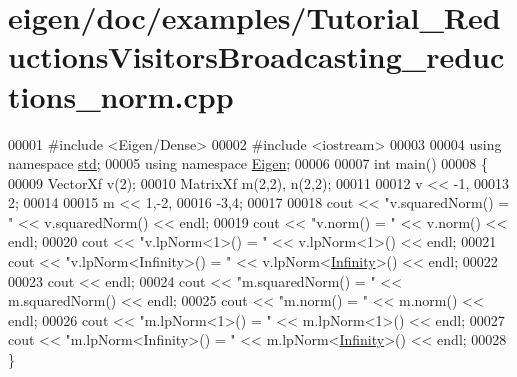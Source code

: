 \hypertarget{eigen_2doc_2examples_2_tutorial___reductions_visitors_broadcasting__reductions__norm_8cpp_source}{}\section{eigen/doc/examples/\+Tutorial\+\_\+\+Reductions\+Visitors\+Broadcasting\+\_\+reductions\+\_\+norm.cpp}
\label{eigen_2doc_2examples_2_tutorial___reductions_visitors_broadcasting__reductions__norm_8cpp_source}

\begin{DoxyCode}
00001 \textcolor{preprocessor}{#include <Eigen/Dense>}
00002 \textcolor{preprocessor}{#include <iostream>}
00003 
00004 \textcolor{keyword}{using namespace }\hyperlink{namespacestd}{std};
00005 \textcolor{keyword}{using namespace }\hyperlink{namespace_eigen}{Eigen};
00006 
00007 \textcolor{keywordtype}{int} main()
00008 \{
00009   VectorXf v(2);
00010   MatrixXf m(2,2), n(2,2);
00011   
00012   v << -1,
00013        2;
00014   
00015   m << 1,-2,
00016        -3,4;
00017 
00018   cout << \textcolor{stringliteral}{"v.squaredNorm() = "} << v.squaredNorm() << endl;
00019   cout << \textcolor{stringliteral}{"v.norm() = "} << v.norm() << endl;
00020   cout << \textcolor{stringliteral}{"v.lpNorm<1>() = "} << v.lpNorm<1>() << endl;
00021   cout << \textcolor{stringliteral}{"v.lpNorm<Infinity>() = "} << v.lpNorm<\hyperlink{namespace_eigen_a7951593b031e13d90223c83d022ce99e}{Infinity}>() << endl;
00022 
00023   cout << endl;
00024   cout << \textcolor{stringliteral}{"m.squaredNorm() = "} << m.squaredNorm() << endl;
00025   cout << \textcolor{stringliteral}{"m.norm() = "} << m.norm() << endl;
00026   cout << \textcolor{stringliteral}{"m.lpNorm<1>() = "} << m.lpNorm<1>() << endl;
00027   cout << \textcolor{stringliteral}{"m.lpNorm<Infinity>() = "} << m.lpNorm<\hyperlink{namespace_eigen_a7951593b031e13d90223c83d022ce99e}{Infinity}>() << endl;
00028 \}
\end{DoxyCode}
